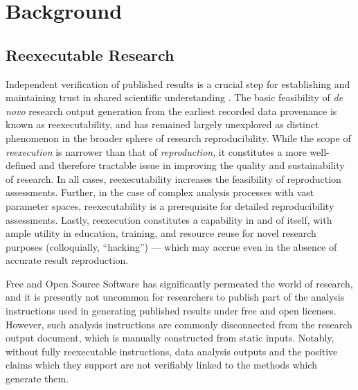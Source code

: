 \section{Background}

\subsection{Reexecutable Research}

Independent verification of published results is a crucial step for establishing and maintaining trust in shared scientific understanding \cite{rpp}.
The basic feasibility of \textit{de novo} research output generation from the earliest recorded data provenance is known as reexecutability, and  has remained largely unexplored as distinct phenomenon in the broader sphere of research reproducibility.
While the scope of \textit{reexecution} is narrower than that of \textit{reproduction}, it constitutes a more well-defined and therefore tractable issue in improving the quality and sustainability of research.
In all cases, reexecutability increases the feasibility of reproduction assessments.
Further, in the case of complex analysis processes with vast parameter spaces, reexecutability is a prerequisite for detailed reproducibility assessments.
Lastly, reexecution constitutes a capability in and of itself, with ample utility in education, training, and resource reuse for novel research purposes (colloquially, “hacking”) — which may accrue even in the absence of accurate result reproduction.

Free and Open Source Software \cite{foss} has significantly permeated the world of research, and it is presently not uncommon for researchers to publish part of the analysis instructions used in generating published results under free and open licenses.
However, such analysis instructions are commonly disconnected from the research output document, which is manually constructed from static inputs.
Notably, without fully reexecutable instructions, data analysis outputs and the positive claims which they support are not verifiably linked to the methods which generate them.


